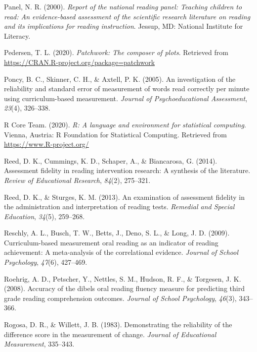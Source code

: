 \documentclass[
  english,
  man, fleqn, noextraspace]{apa6}
\begin{document}
\leavevmode\hypertarget{ref-readingpanel2000}{}%
Panel, N. R. (2000). \emph{Report of the national reading panel: Teaching children to read: An evidence-based assessment of the scientific research literature on reading and its implications for reading instruction}. Jessup, MD: National Institute for Literacy.

\leavevmode\hypertarget{ref-R-patchwork}{}%
Pedersen, T. L. (2020). \emph{Patchwork: The composer of plots}. Retrieved from \url{https://CRAN.R-project.org/package=patchwork}

\leavevmode\hypertarget{ref-poncy2005}{}%
Poncy, B. C., Skinner, C. H., \& Axtell, P. K. (2005). An investigation of the reliability and standard error of measurement of words read correctly per minute using curriculum-based measurement. \emph{Journal of Psychoeducational Assessment}, \emph{23}(4), 326--338.

\leavevmode\hypertarget{ref-R-base}{}%
R Core Team. (2020). \emph{R: A language and environment for statistical computing}. Vienna, Austria: R Foundation for Statistical Computing. Retrieved from \url{https://www.R-project.org/}

\leavevmode\hypertarget{ref-reed2014}{}%
Reed, D. K., Cummings, K. D., Schaper, A., \& Biancarosa, G. (2014). Assessment fidelity in reading intervention research: A synthesis of the literature. \emph{Review of Educational Research}, \emph{84}(2), 275--321.

\leavevmode\hypertarget{ref-reed2013}{}%
Reed, D. K., \& Sturges, K. M. (2013). An examination of assessment fidelity in the administration and interpretation of reading tests. \emph{Remedial and Special Education}, \emph{34}(5), 259--268.

\leavevmode\hypertarget{ref-reschly2009}{}%
Reschly, A. L., Busch, T. W., Betts, J., Deno, S. L., \& Long, J. D. (2009). Curriculum-based measurement oral reading as an indicator of reading achievement: A meta-analysis of the correlational evidence. \emph{Journal of School Psychology}, \emph{47}(6), 427--469.

\leavevmode\hypertarget{ref-roehrig2008}{}%
Roehrig, A. D., Petscher, Y., Nettles, S. M., Hudson, R. F., \& Torgesen, J. K. (2008). Accuracy of the dibels oral reading fluency measure for predicting third grade reading comprehension outcomes. \emph{Journal of School Psychology}, \emph{46}(3), 343--366.

\leavevmode\hypertarget{ref-rogosaetal1983}{}%
Rogosa, D. R., \& Willett, J. B. (1983). Demonstrating the reliability of the difference score in the measurement of change. \emph{Journal of Educational Measurement}, 335--343.
\end{document}
